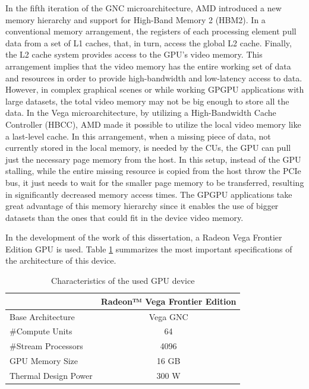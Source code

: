 In the fifth iteration of the GNC microarchitecture, AMD introduced a new memory hierarchy and support for High-Band Memory 2 (HBM2). In a conventional memory arrangement, the registers of each processing element pull data from a set of L1 caches, that, in turn, access the global L2 cache. Finally, the L2 cache system provides access to the GPU's video memory. This arrangement implies that the video memory has the entire working set of data and resources in order to provide high-bandwidth and low-latency access to data. However, in complex graphical scenes or while working GPGPU applications with large datasets, the total video memory may not be big enough to store all the data. In the Vega microarchitecture, by utilizing a  High-Bandwidth Cache Controller (HBCC), AMD made it possible to utilize the local video memory like a last-level cache. In this arrangement, when a missing piece of data, not currently stored in the local memory, is needed by the CUs, the GPU can pull just the necessary page memory from the host. In this setup, instead of the GPU stalling, while the entire missing resource is copied from the host throw the PCIe bus, it just needs to wait for the smaller page memory to be transferred, resulting in significantly decreased memory access times. The GPGPU applications take great advantage of this memory hierarchy since it enables the use of bigger datasets than the ones that could fit in the device video memory.

In the development of the work of this dissertation, a Radeon Vega Frontier Edition GPU is used. Table \ref{tab:gpusepcs} summarizes the most important specifications of the architecture of this device.

\begin{table}[!htb]
    \renewcommand{\arraystretch}{1.2} %
    \centering
        \begin{tabular}{lc}
            \multicolumn{1}{c}{\textbf{}} & \multicolumn{1}{l}{\textbf{Radeon™ Vega Frontier Edition}} \\ \hline
            Base Architecture             & Vega GNC                                                   \\
            \#Compute Units               & 64                                                         \\
            \#Stream Processors           & 4096                                                       \\
            GPU Memory Size               & 16 GB                                                      \\
            Thermal Design Power          & 300 W                                                      \\ \hline
        \end{tabular}
    \caption{Characteristics of the used GPU device}
    \label{tab:gpusepcs}
\end{table}

